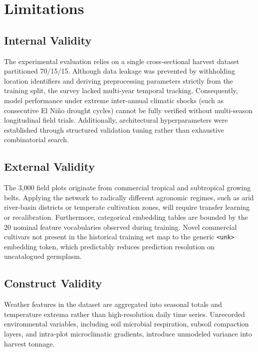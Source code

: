 \documentclass[conference,10pt,letterpaper]{IEEEtran}
\begin{document}
\section{Limitations}

\subsection{Internal Validity}
The experimental evaluation relies on a single cross-sectional harvest dataset partitioned 70/15/15. Although data leakage was prevented by withholding location identifiers and deriving preprocessing parameters strictly from the training split, the survey lacked multi-year temporal tracking. Consequently, model performance under extreme inter-annual climatic shocks (such as consecutive El Ni{\~n}o drought cycles) cannot be fully verified without multi-season longitudinal field trials. Additionally, architectural hyperparameters were established through structured validation tuning rather than exhaustive combinatorial search.

\subsection{External Validity}
The 3,000 field plots originate from commercial tropical and subtropical growing belts. Applying the network to radically different agronomic regimes, such as arid river-basin districts or temperate cultivation zones, will require transfer learning or recalibration. Furthermore, categorical embedding tables are bounded by the 20 nominal feature vocabularies observed during training. Novel commercial cultivars not present in the historical training set map to the generic \texttt{<unk>} embedding token, which predictably reduces prediction resolution on uncatalogued germplasm.

\subsection{Construct Validity}
Weather features in the dataset are aggregated into seasonal totals and temperature extrema rather than high-resolution daily time series. Unrecorded environmental variables, including soil microbial respiration, subsoil compaction layers, and intra-plot microclimatic gradients, introduce unmodeled variance into harvest tonnage.

\end{document}
